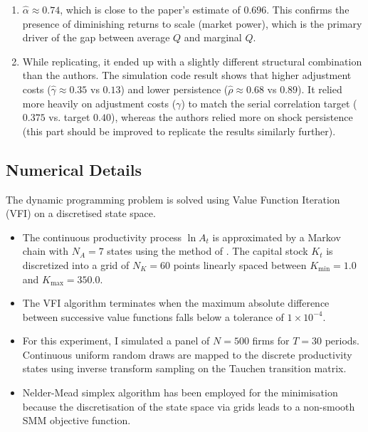 \documentclass[11pt]{article}
\begin{document}
\begin{enumerate}
    The estimation results yields $\hat{\tilde{\phi}}_0 = 0.0005$ with a standard error of $0.0005$. This is statistically indistinguishable from zero and very close to the paper's estimate of $0$. This confirms the paper's main conclusion, which was that once market power is accounted for, costly external finance is not required to match investment moments.
    
    \item $\hat{\alpha} \approx 0.74$, which is close to the paper's estimate of $0.696$. This confirms the presence of diminishing returns to scale (market power), which is the primary driver of the gap between average $Q$ and marginal $Q$.
    
    \item While replicating, it ended up with a slightly different structural combination than the authors. The simulation code result shows that higher adjustment costs ($\hat{\gamma} \approx 0.35$ vs $0.13$) and lower persistence ($\hat{\rho} \approx 0.68$ vs $0.89$). It relied more heavily on adjustment costs ($\gamma$) to match the serial correlation target ($0.375$ vs. target $0.40$), whereas the authors relied more on shock persistence (this part should be improved to replicate the results similarly further).
\end{enumerate}

\subsection{Numerical Details}

The dynamic programming problem is solved using Value Function Iteration (VFI) on a discretised state space. 

\begin{itemize}
    \item The continuous productivity process $\ln A_t$ is approximated by a Markov chain with $N_A = 7$ states using the method of \cite{Tauchen1986}. The capital stock $K_t$ is discretized into a grid of $N_K = 60$ points linearly spaced between $K_{\min}=1.0$ and $K_{\max}=350.0$.
    \item The VFI algorithm terminates when the maximum absolute difference between successive value functions falls below a tolerance of $1 \times 10^{-4}$.
    \item For this experiment, I simulated a panel of $N=500$ firms for $T=30$ periods. Continuous uniform random draws are mapped to the discrete productivity states using inverse transform sampling on the Tauchen transition matrix.
    \item Nelder-Mead simplex algorithm has been employed for the minimisation because the discretisation of the state space via grids leads to a non-smooth SMM objective function. 
\end{itemize}
\printbibliography
\end{document}
